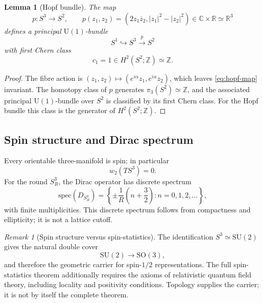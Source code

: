 \documentclass[11pt,a4paper]{article}
\newtheorem{lemma}[theorem]{Lemma}
\theoremstyle{definition}
\theoremstyle{remark}
\newtheorem{remark}[theorem]{Remark}
\newcommand{\Sone}{S^{1}}
\newcommand{\Stwo}{S^{2}}
\newcommand{\Sthree}{S^{3}}
\newcommand{\R}{\mathbb{R}}
\newcommand{\C}{\mathbb{C}}
\newcommand{\Z}{\mathbb{Z}}
\newcommand{\SU}{\mathrm{SU}}
\newcommand{\SO}{\mathrm{SO}}
\newcommand{\U}{\mathrm{U}}
\begin{document}
\begin{lemma}[Hopf bundle]
The map
\begin{equation}
p:\Sthree\to\Stwo,\qquad
p(z_{1},z_{2})=
\left(
2z_{1}\overline{z}_{2},
|z_{1}|^{2}-|z_{2}|^{2}
\right)
\in \C\times\R\simeq\R^{3}
\label{eq:hopf-map}
\end{equation}
defines a principal $\U(1)$-bundle
\[
\Sone\hookrightarrow\Sthree\xrightarrow{p}\Stwo
\]
with first Chern class
\begin{equation}
c_{1}=1\in H^{2}(\Stwo;\Z)\simeq\Z.
\end{equation}
\end{lemma}

\begin{proof}
The fibre action is $(z_{1},z_{2})\mapsto(e^{i\alpha}z_{1},e^{i\alpha}z_{2})$, which leaves
\eqref{eq:hopf-map} invariant.  The homotopy class of $p$ generates
$\pi_{3}(\Stwo)\simeq\Z$, and the associated principal $\U(1)$-bundle over $\Stwo$ is classified
by its first Chern class.  For the Hopf bundle this class is the generator of
$H^{2}(\Stwo;\Z)$.
\end{proof}

\subsection{Spin structure and Dirac spectrum}

Every orientable three-manifold is spin; in particular
\begin{equation}
w_{2}(T\Sthree)=0.
\end{equation}
For the round $\Sthree_{R}$, the Dirac operator has discrete spectrum
\begin{equation}
\mathrm{spec}(D_{\Sthree_{R}})
=
\left\{
\pm\frac{1}{R}\left(n+\frac{3}{2}\right): n=0,1,2,\ldots
\right\},
\label{eq:dirac-spectrum}
\end{equation}
with finite multiplicities.  This discrete spectrum follows from compactness and ellipticity; it is
not a lattice cutoff.

\begin{remark}[Spin structure versus spin-statistics]
The identification $\Sthree\simeq\SU(2)$ gives the natural double cover
\[
\SU(2)\to\SO(3),
\]
and therefore the geometric carrier for spin-$1/2$ representations.  The full spin-statistics
theorem additionally requires the axioms of relativistic quantum field theory, including locality
and positivity conditions.  Topology supplies the carrier; it is not by itself the complete theorem.
\end{remark}
\end{document}
